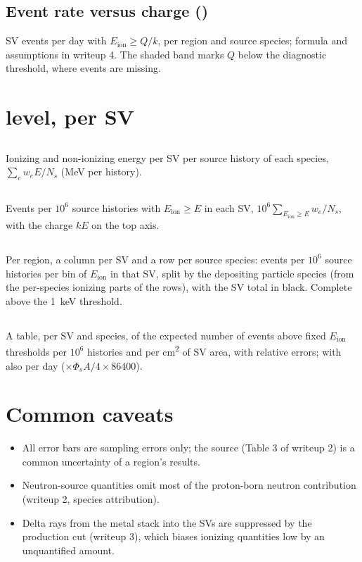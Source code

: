 \subsection{Event rate versus charge ()}
SV events per day with $E_\text{ion}\ge Q/k$, per region and source species; formula and assumptions in writeup 4. The shaded band marks $Q$ below the diagnostic threshold, where events are missing.

\section{\gfour{} level, per SV}

\subsection{}
Ionizing and non-ionizing energy per SV per source history of each species, $\sum_e w_eE/N_s$ (MeV per history).

\subsection{}
Events per $10^6$ source histories with $E_\text{ion}\ge E$ in each SV, $10^6\sum_{E_\text{ion}\ge E} w_e/N_s$, with the charge $kE$ on the top axis.

\subsection{}
Per region, a column per SV and a row per source species: events per $10^6$ source histories per bin of $E_\text{ion}$ in that SV, split by the depositing particle species (from the per-species ionizing parts of the rows), with the SV total in black. Complete above the \SI{1}{keV} threshold.

\subsection{}
A table, per SV and species, of the expected number of events above fixed $E_\text{ion}$ thresholds per $10^6$ histories and per \si{cm^2} of SV area, with \gfour{} relative errors; with  also per day ($\times\Phi_sA/4\times86400$).

\section{Common caveats}
\begin{itemize}
  \item All \gfour{} error bars are \gfour{} sampling errors only; the \mcdc{} source (Table 3 of writeup 2) is a common uncertainty of a region's results.
  \item Neutron-source quantities omit most of the proton-born neutron contribution (writeup 2, species attribution).
  \item Delta rays from the metal stack into the SVs are suppressed by the production cut (writeup 3), which biases ionizing quantities low by an unquantified amount.
\end{itemize}



